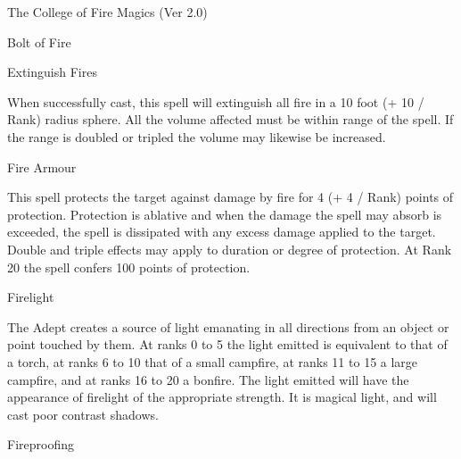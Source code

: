 \begin{Chapter}{The College of Fire Magics (Ver 2.0)}
\begin{spell}[G-1]{Bolt of Fire}
\begin{effects}
\end{effects}
\end{spell}

\begin{spell}[G-2]{Extinguish Fires}

\begin{effects}
When successfully cast, this spell will extinguish all fire in a 10
foot (+ 10 / Rank) radius sphere.  All the volume affected must be
within range of the spell. If the range is doubled or tripled the
volume may likewise be increased.
\end{effects}
\end{spell}

\begin{spell}[G-3]{Fire Armour}
\begin{effects}
This spell protects the target against damage by fire for 4 (+ 4 /
Rank) points of protection.  Protection is ablative and when the
damage the spell may absorb is exceeded, the spell is dissipated with
any excess damage applied to the target.  Double and triple effects
may apply to duration or degree of protection.  At Rank 20 the spell
confers 100 points of protection.
\end{effects}
\end{spell}

\begin{spell}[G-4]{Firelight}

\begin{effects}
The Adept creates a source of light emanating in all directions from
an object or point touched by them. At ranks 0 to 5 the light emitted
is equivalent to that of a torch, at ranks 6 to 10 that of a small
campfire, at ranks 11 to 15 a large campfire, and at ranks 16 to 20 a
bonfire.  The light emitted will have the appearance of firelight of
the appropriate strength.  It is magical light, and will cast poor
contrast shadows.
\end{effects}
\end{spell}

\begin{spell}[G-5]{Fireproofing}


\end{spell}
\end{Chapter}

